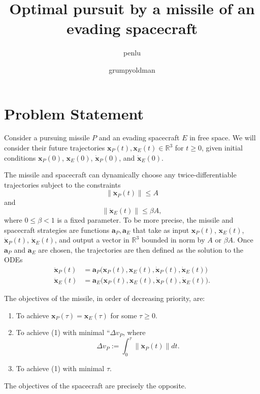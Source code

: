 \documentclass{article}
\newcommand{\eqdef}{:=}
\renewcommand{\vec}[1]{\mathbf{#1}}
\begin{document}
\title{Optimal pursuit by a missile of an evading spacecraft}
\author{penlu \and grumpyoldman}

\maketitle

\section{Problem Statement}
\newcommand{\R}{\mathbb{R}}

Consider a pursuing missile $P$ and an evading spacecraft $E$ in free space.  We
will consider their future trajectories $\vec{x}_P(t), \vec{x}_E(t) \in \R^3$ for $t \ge 0$,
given initial conditions $\vec{x}_P(0)$, $\vec{x}_E(0)$, $\dot{\vec{x}}_P(0)$, and $\dot{\vec{x}}_E(0)$.

The missile and spacecraft can dynamically choose any twice-differentiable trajectories
subject to the constraints \begin{equation}
  \|
  \ddot{\vec{x}}_P(t) \| \le A
\end{equation}
and
\begin{equation}
    \|
  \ddot{\vec{x}}_E(t) \| \le \beta A,
\end{equation}
where $0 \le \beta < 1$ is a fixed parameter.  To be more precise, the missile
and spacecraft strategies are functions $\vec{a}_P, \vec{a}_E$ that take as
input $\vec{x}_P(t)$, $\vec{x}_E(t)$, $\dot{\vec{x}}_P(t)$,
$\dot{\vec{x}}_E(t)$, and output a vector in $\R^3$ bounded in norm by $A$ or
$ \beta A$.  Once $\vec{a}_P$ and $\vec{a}_E$ are chosen, the trajectories are
then defined as the solution to the ODEs
\begin{align}
  \ddot{\vec{x}}_P(t) &= \vec{a}_P \big (\vec{x}_P(t), \vec{x}_E(t),
                        \dot{\vec{x}}_P(t), \dot{\vec{x}}_E(t) \big )\\
  \ddot{\vec{x}}_E(t) &= \vec{a}_E\big (\vec{x}_P(t), \vec{x}_E(t),
                        \dot{\vec{x}}_P(t), \dot{\vec{x}}_E(t) \big ).
\end{align}

The objectives of the missile, in order of decreasing priority, are:
\begin{enumerate}
\item To achieve $\vec{x}_P(\tau) = \vec{x}_E(\tau)$
for some $\tau \ge 0$.
\item To achieve (1) with minimal ``$\Delta v_P$, where
\begin{equation}
  \label{eq:missile-delta-v}
  \Delta v_P \eqdef \int_{0}^\tau \big \| \ddot{\vec{x}}_P(t) \big \| dt.
\end{equation}
\item To achieve (1) with minimal $\tau$.
\end{enumerate}
The objectives of the spacecraft are precisely the opposite.
\end{document}
